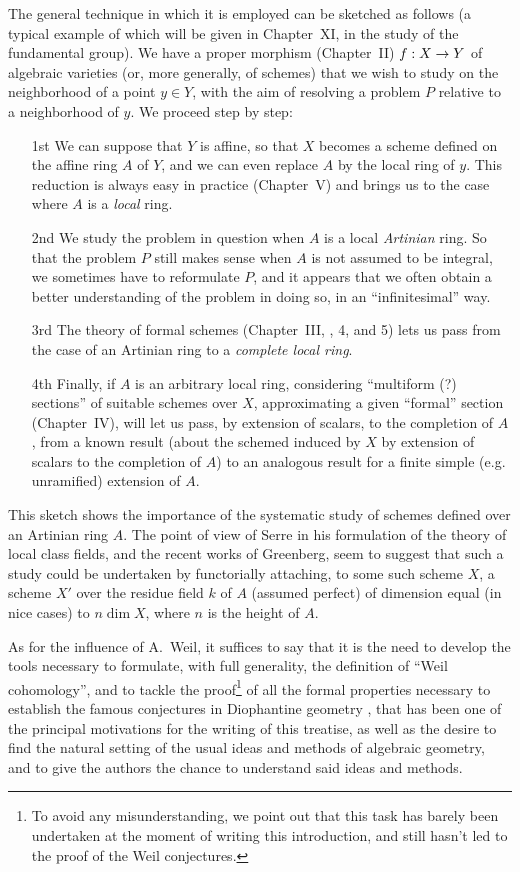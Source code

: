 \documentclass[openany,oneside]{amsbook}
\theoremstyle{ega-env-style}
\theoremstyle{ega-thm-env-style}
\theoremstyle{ega-defn-env-style}
\renewcommand{\to}{\mathchoice{\longrightarrow}{\rightarrow}{\rightarrow}{\rightarrow}}
\def\unsure#1{#1 {\color{red}(?)}}
\newcommand{\oldpage}[2][--]{{\marginpar{\textbf{#1}~|~#2}}\ignorespaces}
\begin{document}
The general technique in which it is employed can be sketched as follows (a typical example of which will be given in Chapter~XI, in the study of the fundamental group).
We have a proper morphism (Chapter~II) $f:X\to Y$ of algebraic varieties (or, more generally, of schemes) that we wish to study on the neighborhood of a point $y\in Y$, with the aim of resolving a problem $P$ relative to a neighborhood of $y$.
We proceed step by step:
\begin{enumerate}
  \item[1st]
    We can suppose that $Y$ is affine, so that $X$ becomes a scheme defined on the affine ring $A$ of $Y$, and we can even replace $A$ by the local ring of $y$.
    This reduction is always easy in practice (Chapter~V) and brings us to the case where $A$ is a \emph{local} ring.
  \item[2nd]
    We study the problem in question when $A$ is a local \emph{Artinian} ring.
    So that the problem $P$ still makes sense when $A$ is not assumed to be integral, we sometimes have to reformulate $P$, and it appears that we often obtain a better understanding of the problem in doing so, in an ``infinitesimal'' way.
  \item[3rd]
    The theory of formal schemes (Chapter~III, \textsection{}, 4, and 5) lets us pass from the case of an Artinian ring to a \emph{complete local ring}.
  \item[4th]
    Finally, if $A$ is an arbitrary local ring, considering ``\unsure{multiform} sections'' of suitable schemes over $X$, approximating a given ``formal'' section (Chapter~IV), will let us pass\oldpage[I]{9}, by extension of scalars, to the completion of $A$, from a known result (about the schemed induced by $X$ by extension of scalars to the completion of $A$) to an analogous result for a finite simple (e.g. unramified) extension of $A$.
\end{enumerate}

This sketch shows the importance of the systematic study of schemes defined over an Artinian ring $A$.
The point of view of Serre in his formulation of the theory of local class fields, and the recent works of Greenberg, seem to suggest that such a study could be undertaken by functorially attaching, to some such scheme $X$, a scheme $X'$ over the residue field $k$ of $A$ (assumed perfect) of dimension equal (in nice cases) to $n\dim X$, where $n$ is the height of $A$.

As for the influence of A.~Weil, it suffices to say that it is the need to develop the tools necessary to formulate, with full generality, the definition of ``Weil cohomology'', and to tackle the proof\footnote{To avoid any misunderstanding, we point out that this task has barely been undertaken at the moment of writing this introduction, and still hasn't led to the proof of the Weil conjectures.} of all the formal properties necessary to establish the famous conjectures in Diophantine geometry \cite{I-19}, that has been one of the principal motivations for the writing of this treatise, as well as the desire to find the natural setting of the usual ideas and methods of algebraic geometry, and to give the authors the chance to understand said ideas and methods.
\end{document}
